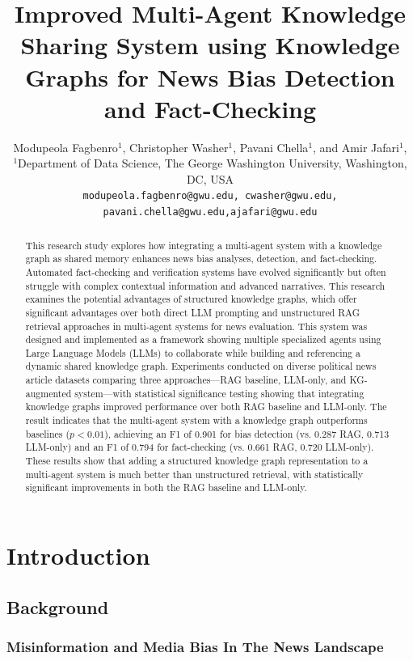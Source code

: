 \documentclass[11pt]{article}
\title{Improved Multi-Agent Knowledge Sharing System using Knowledge Graphs for News Bias Detection and Fact-Checking}
\author{Modupeola Fagbenro$^{1}$, Christopher Washer$^{1}$, Pavani Chella$^{1}$, and Amir Jafari$^{1}$,\\
\small $^{1}$Department of Data Science, The George Washington University, Washington, DC, USA\\
\small \texttt{modupeola.fagbenro@gwu.edu, cwasher@gwu.edu, pavani.chella@gwu.edu,ajafari@gwu.edu}
}
\date{} %
\begin{document}
\maketitle

\begin{abstract}

This research study explores how integrating a multi-agent system with a knowledge graph as shared memory enhances news bias analyses, detection, and fact-checking. Automated fact-checking and verification systems have evolved significantly but often struggle with complex contextual information and advanced narratives. This research examines the potential advantages of structured knowledge graphs, which offer significant advantages over both direct LLM prompting and unstructured RAG retrieval approaches in multi-agent systems for news evaluation.  This system was designed and implemented as a framework showing multiple specialized agents using Large Language Models (LLMs) to collaborate while building and referencing a dynamic shared knowledge graph. Experiments conducted on diverse political news article datasets comparing three approaches—RAG baseline, LLM-only, and KG-augmented system—with statistical significance testing showing that integrating knowledge graphs improved performance over both RAG baseline and LLM-only. The result indicates that the multi-agent system with a knowledge graph outperforms baselines ($p<0.01$), achieving an F1 of 0.901 for bias detection (vs. 0.287 RAG, 0.713 LLM-only) and an F1 of 0.794 for fact-checking (vs. 0.661 RAG, 0.720 LLM-only). These results show that adding a structured knowledge graph representation to a multi-agent system is much better than unstructured retrieval, with statistically significant improvements in both the RAG baseline and LLM-only. 



  
\end{abstract}

\section{Introduction}
\subsection{Background}

\subsubsection{\textbf{Misinformation and Media Bias In The News Landscape}}
\end{document}
